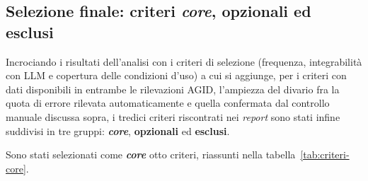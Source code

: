 \subsection{Selezione finale: criteri \emph{core}, opzionali ed esclusi}

Incrociando i risultati dell'analisi con i criteri di selezione (frequenza, integrabilità con LLM e copertura delle condizioni d'uso) a cui si aggiunge, per i criteri con dati disponibili in entrambe le rilevazioni AGID, l'ampiezza del divario fra la quota di errore rilevata automaticamente e quella confermata dal controllo manuale discussa sopra, i tredici criteri riscontrati nei \emph{report} sono stati infine suddivisi in tre gruppi: \textbf{\emph{core}}, \textbf{opzionali} ed \textbf{esclusi}.

Sono stati selezionati come \textbf{\emph{core}} otto criteri, riassunti nella tabella~\ref{tab:criteri-core}. 

